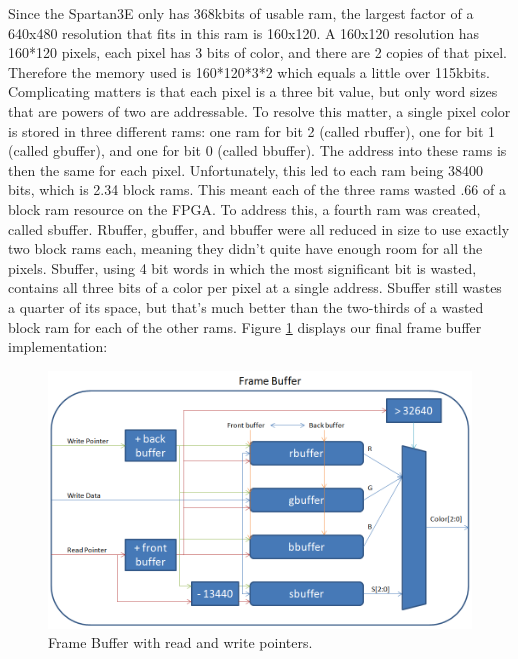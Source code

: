 \documentclass[onecolumn]{IEEEtran}
\begin{document}
Since the Spartan3E only has 368kbits of usable ram, the largest factor of a 640x480 resolution that fits in this ram is 160x120.  A 160x120 resolution has 160*120 pixels, each pixel has 3 bits of color, and there are 2 copies of that pixel.  Therefore the memory used is 160*120*3*2 which equals a little over 115kbits.  Complicating matters is that each pixel is a three bit value, but only word sizes that are powers of two are addressable.  To resolve this matter, a single pixel color is stored in three different rams: one ram for bit 2 (called rbuffer), one for bit 1 (called gbuffer), and one for bit 0 (called bbuffer).  The address into these rams is then the same for each pixel.  Unfortunately, this led to each ram being 38400 bits, which is 2.34 block rams.  This meant each of the three rams wasted .66 of a block ram resource on the FPGA.  To address this, a fourth ram was created, called sbuffer.  Rbuffer, gbuffer, and bbuffer were all reduced in size to use exactly two block rams each, meaning they didn't quite have enough room for all the pixels.  Sbuffer, using 4 bit words in which the most significant bit is wasted, contains all three bits of a color per pixel at a single address.  Sbuffer still wastes a quarter of its space, but that's much better than the two-thirds of a wasted block ram for each of the other rams.  Figure \ref{fig:frameBuffer} displays our final frame buffer implementation:

\begin{figure}[H]
	\centering
	\includegraphics[width=1.0\textwidth]{framebuffer.png}
	\caption{Frame Buffer with read and write pointers.}
	\label{fig:frameBuffer}
\end{figure}
\end{document}
